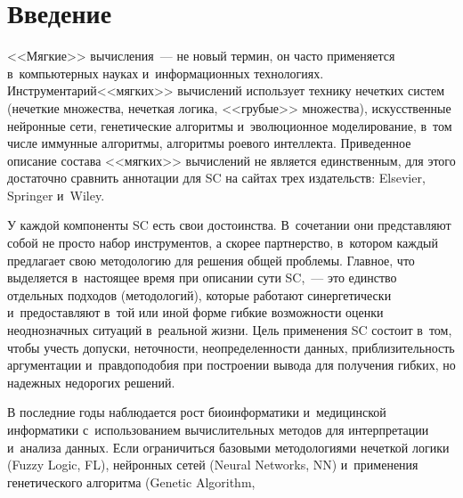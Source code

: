 \begin{multicols}{2}

\label{st\stat}

\section{Введение}

     <<Мягкие>> вычисления~--- не новый термин, он 
часто применяется в~компьютерных науках и~информационных технологиях. 
Инструментарий\linebreak <<мягких>> вычислений использует технику нечетких систем 
(нечеткие множества, нечеткая логика, <<грубые>> множества), искусственные 
нейронные сети, генетические алгоритмы и~эволюционное моделирование, 
в~том чис\-ле иммунные алгоритмы, алгоритмы роевого интеллекта. Приведенное 
описание состава <<мягких>> вычислений не является единственным, для 
этого достаточно сравнить аннотации для SC на сайтах трех издательств: 
Elsevier, Springer и~Wiley.
     
     У каждой компоненты SC есть свои достоинства. В~сочетании они 
представляют собой не просто набор инструментов, а скорее партнерство, 
в~котором каждый предлагает свою методологию для решения общей 
проблемы. Главное, что выделяется в~настоящее время при описании сути  
SC,~--- это единство отдельных подходов (методологий), которые работают 
синергетически и~предоставляют в~той или иной форме гибкие возможности 
оценки неоднозначных ситуаций в~реальной жизни.
%
 Цель применения SC 
состоит в~том, чтобы учесть допуски, неточности, неопределенности данных, 
приблизительность аргументации и~правдоподобия при построении вывода для 
получения гибких, но надежных недорогих решений.
     
     В последние годы наблюдается рост биоинформатики и~медицинской 
информатики с~использованием вычислительных методов для интерпретации 
и~анализа данных. Если ограничиться базовыми
 методологиями нечеткой логики 
(Fuzzy Logic, FL),
нейронных сетей (Neural Networks, NN) и~применения 
генетического алгоритма (Genetic Algorithm,
\begin{table*}\small %
\begin{center}
\vspace*{2ex}


\end{center}
\end{table*}
\end{multicols}
